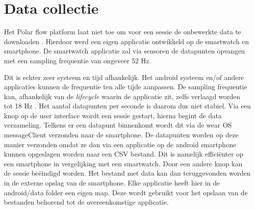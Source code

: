\section{Data collectie} \label{sectie:datacollectie}
Het Polar flow platform laat niet toe om voor een sessie de onbewerkte data te downloaden \cite{ref28}. Hierdoor werd een eigen applicatie ontwikkeld op de smartwatch en smartphone. De smartwatch applicatie zal via sensoren de datapunten opvangen met een sampling frequentie van ongeveer 52 Hz. 

Dit is echter zeer systeem en tijd afhankelijk. Het android systeem en/of andere applicaties kunnen de frequentie ten alle tijde aanpassen. De sampling frequentie kan, afhankelijk van de \textit{lifecycle} waarin de applicatie zit, zelfs verlaagd worden tot 18 Hz \cite{ref68}. Het aantal datapunten per seconde is daarom dus niet stabiel. 
Via een knop op de user interface wordt een sessie gestart, hierna begint de data verzameling. Telkens er een datapunt binnenkomt wordt dit via de wear OS messageClient verzonden naar de smartphone. De datapunten worden op deze manier verzonden omdat ze dan via een applicatie op de android smartphone kunnen opgeslagen worden naar een CSV bestand. Dit is namelijk efficiënter op een smartphone in vergelijking met een smartwatch. Door een andere knop kan de sessie beëindigd worden. Het bestand met data kan dan teruggevonden worden in de externe opslag van de smartphone. Elke applicatie heeft hier in de android/data folder een eigen map. Deze wordt gebruikt voor het opslaan van de bestanden behorend tot de overeenkomstige applicatie.

